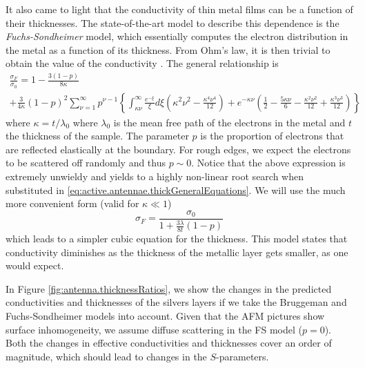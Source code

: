 It also came to light that the conductivity 
of thin metal films can be a function of their thicknesses. 
The state-of-the-art model to describe this dependence is the 
\textit{Fuchs-Sondheimer} model, which essentially computes the 
electron distribution in the metal as a function of its thickness. 
From Ohm's law, it is then trivial to obtain the value of the 
conductivity \cite{FUC1938,SON1952,PUR2007}. The general relationship
is
	\begin{multline}
		\frac{\sigma_F}{\sigma_0} = 
			1-\frac{3(1-p)}{8\kappa}\\+\frac{3}{4\kappa}\left(1-p\right)^2
			\sum_{\nu=1}^\infty p^{\nu-1}
			\left\{
				\int_{\kappa\nu}^\infty\frac{e^{-\xi}}{\xi}d\xi\left(\kappa^2\nu^2-\frac{\kappa^4\nu^4}{12}\right)
				+e^{-\kappa\nu}\left(\frac{1}{2}-\frac{5\kappa\nu}{6}-\frac{\kappa^2\nu^2}{12}+\frac{\kappa^3\nu^3}{12}\right)	
			\right\}
	\end{multline}
where $\kappa=t/\lambda_0$ where $\lambda_0$ is the mean free path of the electrons in the metal and
$t$ the thickness of the sample. The parameter $p$ is the proportion of electrons that are reflected
elastically at the boundary. For rough edges, we expect the electrons to be scattered off randomly 
and thus $p\sim0$. Notice that the above expression is extremely unwieldy and yields to a highly
non-linear root search when substituted in \eqref{eq:active.antennae.thickGeneralEquations}. 
We will use the much more convenient form (valid for $\kappa\ll1$) \cite{FUC1938}
  \begin{equation}
      \sigma_F = \frac{\sigma_0}{1+\frac{3\lambda}{8t}\left(1-p\right)}
  \end{equation}
which leads to a simpler cubic equation for the thickness.
This model states that conductivity
diminishes as the thickness of the metallic layer gets smaller, 
as one would expect.

In Figure \ref{fig:antenna.thicknessRatios}, we show the changes
in the predicted conductivities and thicknesses of the silvers layers
if we take the Bruggeman and Fuchs-Sondheimer models into account. 
Given that the AFM pictures
show surface inhomogeneity, we assume diffuse scattering in 
the FS model ($p=0$). Both the changes in effective conductivities
and thicknesses cover an order of magnitude, which should lead
to changes in the $S$-parameters. 


